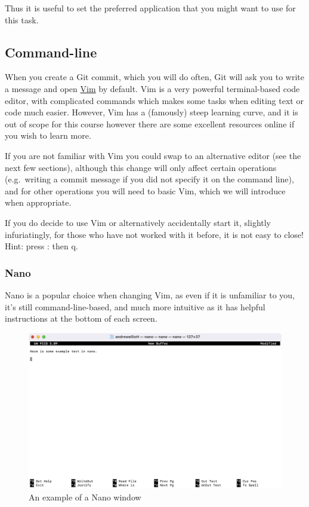 \documentclass[
  letterpaper,
  DIV=11,
  numbers=noendperiod]{scrartcl}
\begin{document}
Thus it is useful to set the preferred application that you might want
to use for this task.

\subsection{Command-line}

When you create a Git commit, which you will do often, Git will ask you
to write a message and open \href{https://www.vim.org}{Vim} by default.
Vim is a very powerful terminal-based code editor, with complicated
commands which makes some tasks when editing text or code much easier.
However, Vim has a (famously) steep learning curve, and it is out of
scope for this course however there are some excellent resources online
if you wish to learn more.

If you are not familiar with Vim you could swap to an alternative editor
(see the next few sections), although this change will only affect
certain operations (e.g.~writing a commit message if you did not specify
it on the command line), and for other operations you will need to basic
Vim, which we will introduce when appropriate.

If you do decide to use Vim or alternatively accidentally start it,
slightly infuriatingly, for those who have not worked with it before, it
is not easy to close! Hint: press : then q.

\subsubsection{Nano}\label{nano}

Nano is a popular choice when changing Vim, as even if it is unfamiliar
to you, it's still command-line-based, and much more intuitive as it has
helpful instructions at the bottom of each screen.

\begin{figure}[H]

{\centering \includegraphics{images/image6.png}

}

\caption{An example of a Nano window}

\end{figure}%
\end{document}

